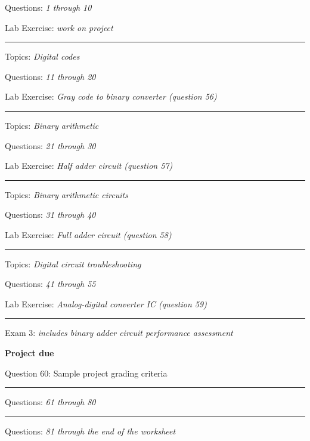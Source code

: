 \hskip 10pt Questions: {\it 1 through 10}
 
\hskip 10pt Lab Exercise: {\it work on project}
 
\vskip 10pt
\hrule \vskip 5pt
\noindent
{}

\hskip 10pt Topics: {\it Digital codes}
 
\hskip 10pt Questions: {\it 11 through 20}
 
\hskip 10pt Lab Exercise: {\it Gray code to binary converter (question 56)}
 
\vskip 10pt
\hrule \vskip 5pt
\noindent
{}

\hskip 10pt Topics: {\it Binary arithmetic}
 
\hskip 10pt Questions: {\it 21 through 30}
 
\hskip 10pt Lab Exercise: {\it Half adder circuit (question 57)}
 
\vskip 10pt
\hrule \vskip 5pt
\noindent
{}

\hskip 10pt Topics: {\it Binary arithmetic circuits}
 
\hskip 10pt Questions: {\it 31 through 40}
 
\hskip 10pt Lab Exercise: {\it Full adder circuit (question 58)}
 
\vskip 10pt
\hrule \vskip 5pt
\noindent
{}

\hskip 10pt Topics: {\it Digital circuit troubleshooting}
 
\hskip 10pt Questions: {\it 41 through 55}
 
\hskip 10pt Lab Exercise: {\it Analog-digital converter IC (question 59)}
 
\vskip 10pt
\hrule \vskip 5pt
\noindent
{}

\hskip 10pt Exam 3: {\it includes binary adder circuit performance assessment}
 
\hskip 10pt {\bf Project due}

\hskip 10pt Question 60: Sample project grading criteria
 
\vskip 10pt
\hrule \vskip 5pt
\noindent
{}

\hskip 10pt Questions: {\it 61 through 80}
 
\vskip 10pt
\hrule \vskip 5pt
\noindent
{}

\hskip 10pt Questions: {\it 81 through the end of the worksheet}
 
